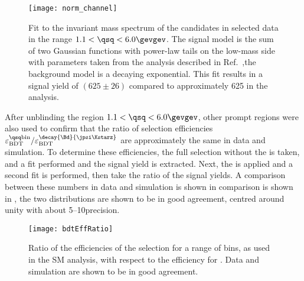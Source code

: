 \begin{figure}
  \begin{center}
    \texttt{[image: norm\_channel]}
    \caption[Fit to the normalization channel, \btokstrmumu in the range $1.1<\qsq<6.0\gevgev$]
    {
      Fit to the invariant mass spectrum of the \Bd candidates in selected data in the range
      $1.1<\qsq<6.0\gevgev$.
      The signal model is the sum of two Gaussian functions with power-law tails on the low-mass
      side with parameters taken from the analysis described in
      Ref.~\protect\cite{LHCb-CONF-2015-002},the background model is a decaying exponential.
      This fit results in a signal yield of $(625\pm26)$ compared to approximately 625 in the \sm
      analysis.
    }
    \label{fig:db:norm}
  \end{center}
\end{figure}

After unblinding the region $1.1<\qsq<6.0\gevgev$, other prompt \qsq regions were also used to
confirm that the ratio of \bdt selection efficiencies
$\varepsilon_\mathrm{BDT}^\mathrm{\qsq bin} / \varepsilon_\mathrm{BDT}^{\decay{\Bd}{\jpsi\Kstarz}}$
are approximately the same in data and simulation.
To determine these efficiencies, the full selection without the \BDT is taken, and a fit performed
and the signal yield is extracted.
Next, the \BDT is applied and a second fit is performed, then take the ratio of the signal
yields.
A comparison between these numbers in data and simulation is shown in comparison is shown in
, the two distributions are shown to be in good agreement, centred around
unity with about 5--10\pc precision.

\begin{figure}
  \begin{center}
    \texttt{[image: bdtEffRatio]}
    \caption{
      Ratio of the efficiencies of the \bdt selection for a range of \qsq bins, as used in the SM
      \btokstrmumu analysis, with respect to the efficiency for \decay{\Bd}{\jpsi\Kstarz}.
      Data and simulation are shown to be in good agreement.
    }
    \label{fig:bdtEffRatio}
  \end{center}
\end{figure}

